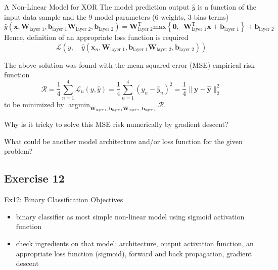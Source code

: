 \documentclass[mathserif, aspectratio=1610]{intbeamer}
\begin{document}
\begin{frame}[t]{A Non-Linear Model for XOR}
The model prediction output $\hat{y}$ is a function of the input data sample and the 9 model parameters (6 weights, 3 bias terms)
$$
\hat{y}\left(\bm{x},\bm{W}_\text{layer 1}, \bm{b}_\text{layer 1}
\bm{W}_\text{layer 2}, \bm{b}_\text{layer 2}\right)
=
\bm{W}_\text{layer 2}^\mathrm{T}
\mathrm{max}\left\{\bm{0},\,\,\,\bm{W}_\text{layer 1}^\mathrm{T} \bm{x} + \bm{b}_\text{layer 1}\right\}
+ \bm{b}_\text{layer 2}
$$
Hence, definition of an appropriate loss function is required
$$
\mathcal{L}\left(y,\quad\hat{y}\left(\bm{x}_n, \bm{W}_\text{layer 1}, \bm{b}_\text{layer 1}
\bm{W}_\text{layer 2}, \bm{b}_\text{layer 2}\right)\right)
$$

The above solution was found with the mean squared error (MSE) empirical risk function
$$\mathcal{R} = \frac{1}{4}\sum_{n=1}^4 \mathcal{L}_n(y, \hat{y}) = \frac{1}{4}\sum_{n=1}^4 (y_n-\hat{y}_n)^2 = \frac{1}{4}\lVert\bm{y} - \hat{\bm{y}}\rVert_2^2$$
to be minimized by $\operatorname*{argmin}_{\bm{W}_\text{layer 1}, \bm{b}_\text{layer 1}
\bm{W}_\text{layer 2}, \bm{b}_\text{layer 2}} \mathcal{R}$.

Why is it tricky to solve this MSE risk numerically by gradient descent?

What could be another model architecture and/or loss function for the given problem?



\end{frame}




\subsection{Exercise 12}

\begin{frame}{Ex12: Binary Classification}
Objectives
\begin{itemize}
\item binary classifier as most simple non-linear model using sigmoid activation function
\item check ingredients on that model: architecture, output activation function, an appropriate loss function (sigmoid), forward and back propagation, gradient descent
\end{itemize}
\end{frame}
\end{document}
